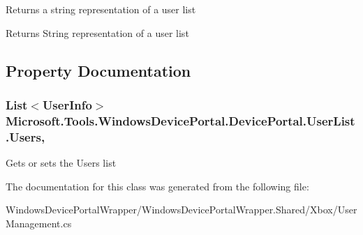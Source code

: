 Returns a string representation of a user list 

\begin{DoxyReturn}{Returns}
String representation of a user list
\end{DoxyReturn}


\subsection{Property Documentation}
\subsubsection[{\texorpdfstring{Users}{Users}}]{\setlength{\rightskip}{0pt plus 5cm}List$<${\bf User\+Info}$>$ Microsoft.\+Tools.\+Windows\+Device\+Portal.\+Device\+Portal.\+User\+List.\+Users\hspace{0.3cm}{\ttfamily [get]}, {\ttfamily [set]}}\hypertarget{class_microsoft_1_1_tools_1_1_windows_device_portal_1_1_device_portal_1_1_user_list_a2476a3774dce6a462b593673913ae54e}{}\label{class_microsoft_1_1_tools_1_1_windows_device_portal_1_1_device_portal_1_1_user_list_a2476a3774dce6a462b593673913ae54e}


Gets or sets the Users list 



The documentation for this class was generated from the following file\+:\begin{DoxyCompactItemize}
\item 
Windows\+Device\+Portal\+Wrapper/\+Windows\+Device\+Portal\+Wrapper.\+Shared/\+Xbox/User\+Management.\+cs\end{DoxyCompactItemize}
